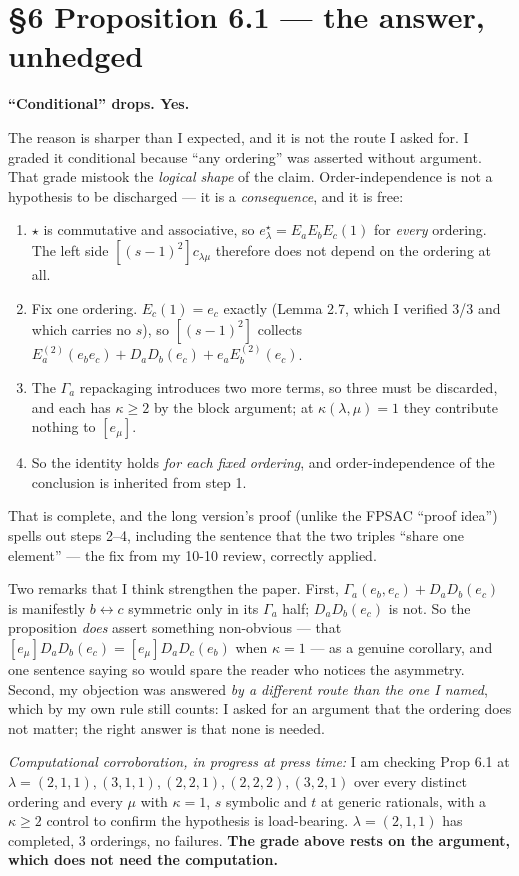 \documentclass[11pt]{article}
\begin{document}
\section*{\S6 Proposition 6.1 --- the answer, unhedged}
\textbf{``Conditional'' drops. Yes.}

The reason is sharper than I expected, and it is not the route I asked for. I graded it
conditional because ``any ordering'' was asserted without argument. That grade mistook
the \emph{logical shape} of the claim. Order-independence is not a hypothesis to be
discharged --- it is a \emph{consequence}, and it is free:
\begin{enumerate}\itemsep1pt
\item $\star$ is commutative and associative, so $e^\star_\lambda=E_aE_bE_c(1)$ for
\emph{every} ordering. The left side $[(s-1)^2]c_{\lambda\mu}$ therefore does not depend
on the ordering at all.
\item Fix one ordering. $E_c(1)=e_c$ exactly (Lemma 2.7, which I verified 3/3 and which
carries no $s$), so $[(s-1)^2]$ collects
$E_a^{(2)}(e_be_c)+D_aD_b(e_c)+e_aE_b^{(2)}(e_c)$.
\item The $\Gamma_a$ repackaging introduces two more terms, so three must be discarded,
and each has $\kappa\ge2$ by the block argument; at $\kappa(\lambda,\mu)=1$ they
contribute nothing to $[e_\mu]$.
\item So the identity holds \emph{for each fixed ordering}, and order-independence of
the conclusion is inherited from step 1.
\end{enumerate}
That is complete, and the long version's proof (unlike the FPSAC ``proof idea'') spells
out steps 2--4, including the sentence that the two triples ``share one element'' --- the
fix from my 10-10 review, correctly applied.

Two remarks that I think strengthen the paper. First,
$\Gamma_a(e_b,e_c)+D_aD_b(e_c)$ is manifestly $b\leftrightarrow c$ symmetric only in its
$\Gamma_a$ half; $D_aD_b(e_c)$ is not. So the proposition \emph{does} assert something
non-obvious --- that $[e_\mu]D_aD_b(e_c)=[e_\mu]D_aD_c(e_b)$ when $\kappa=1$ --- as a
genuine corollary, and one sentence saying so would spare the reader who notices the
asymmetry. Second, my objection was answered \emph{by a different route than the one I
named}, which by my own rule still counts: I asked for an argument that the ordering
does not matter; the right answer is that none is needed.

\emph{Computational corroboration, in progress at press time:} I am checking Prop 6.1 at
$\lambda=(2,1,1),(3,1,1),(2,2,1),(2,2,2),(3,2,1)$ over every distinct ordering and every
$\mu$ with $\kappa=1$, $s$ symbolic and $t$ at generic rationals, with a $\kappa\ge2$
control to confirm the hypothesis is load-bearing. $\lambda=(2,1,1)$ has completed, 3
orderings, no failures. \textbf{The grade above rests on the argument, which does not
need the computation.}
\end{document}
